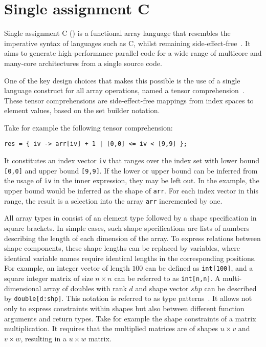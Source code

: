 
\section{Single assignment C}\label{sac}

Single assignment C (\sac{}) is a functional array language that resembles the imperative syntax of languages such as C, whilst remaining side-effect-free~\cite{sac1,sac2}.
It aims to generate high-performance parallel code for a wide range of multicore and many-core architectures from a single source code.

One of the key design choices that makes this possible is the use of a single language construct for all array operations, named a tensor comprehension~\cite{sac-tensor}.
These tensor comprehensions are side-effect-free mappings from index spaces to element values, based on the set builder notation.

Take for example the following tensor comprehension:

\begin{verbatim}
res = { iv -> arr[iv] + 1 | [0,0] <= iv < [9,9] };
\end{verbatim}

It constitutes an index vector \verb|iv| that ranges over the index set with lower bound \verb|[0,0]| and upper bound \verb|[9,9]|.
If the lower or upper bound can be inferred from the usage of \verb|iv| in the inner expression, they may be left out.
In the example, the upper bound would be inferred as the shape of \verb|arr|.
For each index vector in this range, the result is a selection into the array \verb|arr| incremented by one.

All array types in \sac{} consist of an element type followed by a shape specification in square brackets.
In simple cases, such shape specifications are lists of numbers describing the length of each dimension of the array.
To express relations between shape components, these shape lengths can be replaced by variables, where identical variable names require identical lengths in the corresponding positions.
For example, an integer vector of length $100$ can be defined as \verb|int[100]|, and a square integer matrix of size $n \times n$ can be referred to as \verb|int[n,n]|.
A multi-dimensional array of doubles with rank $d$ and shape vector $shp$ can be described by \verb|double[d:shp]|.
This notation is referred to as type patterns~\cite{sac-typepattern}.
It allows not only to express constraints within shapes but also between different function arguments and return types.
Take for example the shape constraints of a matrix multiplication.
It requires that the multiplied matrices are of shapes $u \times v$ and $v \times w$, resulting in a $u \times w$ matrix.

